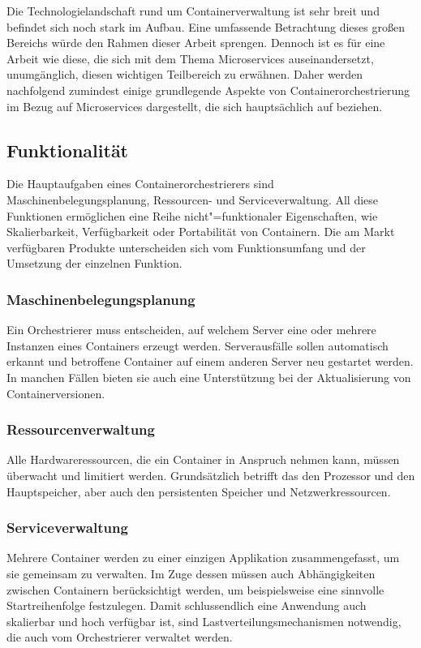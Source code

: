 Die Technologielandschaft rund um Containerverwaltung ist sehr breit und befindet sich noch stark im Aufbau. Eine umfassende Betrachtung dieses großen Bereichs würde den Rahmen dieser Arbeit sprengen. Dennoch ist es für eine Arbeit wie diese, die sich mit dem Thema Microservices auseinandersetzt, unumgänglich, diesen wichtigen Teilbereich zu erwähnen. Daher werden nachfolgend zumindest einige grundlegende Aspekte von Containerorchestrierung im Bezug auf Microservices dargestellt, die sich hauptsächlich auf \cite{ContainerOrcaWars} beziehen. 

\subsection{Funktionalität}

Die Hauptaufgaben eines Containerorchestrierers sind Maschinenbelegungsplanung, Ressourcen- und Serviceverwaltung. All diese Funktionen ermöglichen eine Reihe nicht"=funktionaler Eigenschaften, wie Skalierbarkeit, Verfügbarkeit oder Portabilität von Containern. Die am Markt verfügbaren Produkte unterscheiden sich vom Funktionsumfang und der Umsetzung der einzelnen Funktion.

\subsubsection{Maschinenbelegungsplanung}

Ein Orchestrierer muss entscheiden, auf welchem Server eine oder mehrere Instanzen eines Containers erzeugt werden. Serverausfälle sollen automatisch erkannt und betroffene Container auf einem anderen Server neu gestartet werden. In manchen Fällen bieten sie auch eine Unterstützung bei der Aktualisierung von Containerversionen.

\subsubsection{Ressourcenverwaltung}

Alle Hardwareressourcen, die ein Container in Anspruch nehmen kann, müssen überwacht und limitiert werden. Grundsätzlich betrifft das den Prozessor und den Hauptspeicher, aber auch den persistenten Speicher und Netzwerkressourcen.

\subsubsection{Serviceverwaltung}

Mehrere Container werden zu einer einzigen Applikation zusammengefasst, um sie gemeinsam zu verwalten. Im Zuge dessen müssen auch Abhängigkeiten zwischen Containern berücksichtigt werden, um beispielsweise eine sinnvolle Startreihenfolge festzulegen. Damit schlussendlich eine Anwendung auch skalierbar und hoch verfügbar ist, sind Lastverteilungsmechanismen notwendig, die auch vom Orchestrierer verwaltet werden.

